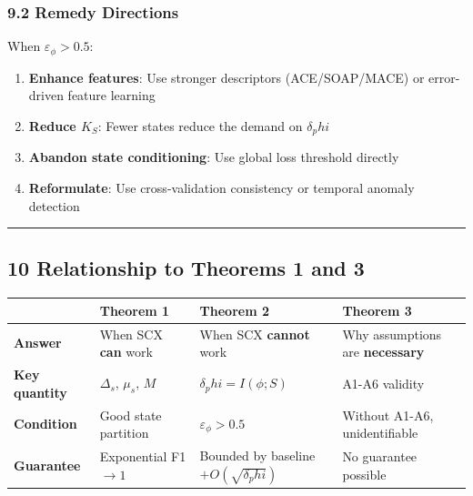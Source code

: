 \documentclass[
  12pt,
]{ctexart}
\providecommand{\tightlist}{%
  \setlength{\itemsep}{0pt}\setlength{\parskip}{0pt}}
\begin{document}
\subsubsection{9.2 Remedy Directions}\label{remedy-directions}

When \(\varepsilon_\phi > 0.5\):

\begin{enumerate}
\def\labelenumi{\arabic{enumi}.}
\tightlist
\item
  \textbf{Enhance features}: Use stronger descriptors (ACE/SOAP/MACE) or
  error-driven feature learning
\item
  \textbf{Reduce \(K_S\)}: Fewer states reduce the demand on
  \(\delta_phi\)
\item
  \textbf{Abandon state conditioning}: Use global loss threshold
  directly
\item
  \textbf{Reformulate}: Use cross-validation consistency or temporal
  anomaly detection
\end{enumerate}

\begin{center}\rule{0.5\linewidth}{0.5pt}\end{center}

\subsection{10 Relationship to Theorems 1 and
3}\label{relationship-to-theorems-1-and-3}

\begin{longtable}[]{@{}
  >{\raggedright\arraybackslash}p{}
  >{\raggedright\arraybackslash}p{}
  >{\raggedright\arraybackslash}p{}
  >{\raggedright\arraybackslash}p{}@{}}
\toprule\noalign{}
\begin{minipage}[b]{\linewidth}\raggedright
\end{minipage} & \begin{minipage}[b]{\linewidth}\raggedright
Theorem 1
\end{minipage} & \begin{minipage}[b]{\linewidth}\raggedright
Theorem 2
\end{minipage} & \begin{minipage}[b]{\linewidth}\raggedright
Theorem 3
\end{minipage} \\
\midrule\noalign{}
\endhead
\bottomrule\noalign{}
\endlastfoot
\textbf{Answer} & When SCX \textbf{can} work & When SCX \textbf{cannot}
work & Why assumptions are \textbf{necessary} \\
\textbf{Key quantity} & \(\Delta_s\), \(\mu_s\), \(M\) &
\(\delta_phi = I(\phi; S)\) & A1-A6 validity \\
\textbf{Condition} & Good state partition & \(\varepsilon_\phi > 0.5\) &
Without A1-A6, unidentifiable \\
\textbf{Guarantee} & Exponential F1 \(\to 1\) & Bounded by baseline
\(+ O(\sqrt{\delta_phi})\) & No guarantee possible \\
\end{longtable}
\end{document}
